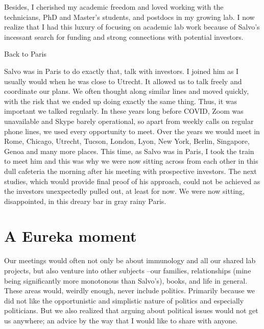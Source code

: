 \documentclass[authordate, editorial]{jote-new-article}
\begin{document}
	Besides, I cherished my academic freedom and loved working with the technicians, PhD and Master's students, and postdocs in my growing lab. I now realize that I had this luxury of focusing on academic lab work because of Salvo's incessant search for funding and strong connections with potential investors.







	Back to Paris



	Salvo was in Paris to do exactly that, talk with investors. I joined him as I usually would when he was close to Utrecht. It allowed us to talk freely and coordinate our plans. We often thought along similar lines and moved quickly, with the risk that we ended up doing exactly the same thing. Thus, it was important we talked regularly. In these years long before COVID, Zoom was unavailable and Skype barely operational, so apart from weekly calls on regular phone lines, we used every opportunity to meet. Over the years we would meet in Rome, Chicago, Utrecht, Tucson, London, Lyon, New York, Berlin, Singapore, Genoa and many more places. This time, as Salvo was in Paris, I took the train to meet him and this was why we were now sitting across from each other in this dull cafeteria the morning after his meeting with prospective investors. The next studies, which would provide final proof of his approach, could not be achieved as the investors unexpectedly pulled out, at least for now. We were now sitting, disappointed, in this dreary bar in gray rainy Paris.



	\section{A Eureka moment}



	Our meetings would often not only be about immunology and all our shared lab projects, but also venture into other subjects --our families, relationships (mine being significantly more monotonous than Salvo's), books, and life in general. These areas would, weirdly enough, never include politics. Primarily because we did not like the opportunistic and simplistic nature of politics and especially politicians. But we also realized that arguing about political issues would not get us anywhere; an advice by the way that I would like to share with anyone.
\end{document}
